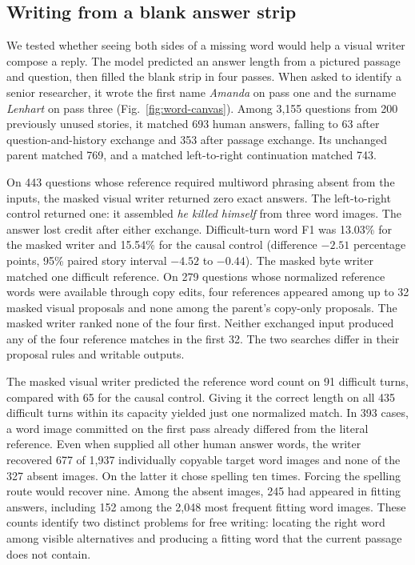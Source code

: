 \documentclass[12pt,a4paper]{article}
\providecommand{\DIFadd}[1]{{\protect\color{blue} \sf #1}} %
\begin{document}
\subsection*{\DIFadd{Writing from a blank answer strip}}
\DIFadd{We tested whether seeing both sides of a missing word would help a visual writer compose a reply. The model predicted an answer length from a pictured passage and question, then filled the blank strip in four passes. When asked to identify a senior researcher, it wrote the first name \emph{Amanda} on pass one and the surname \emph{Lenhart} on pass three (Fig.~\ref{fig:word-canvas}). Among 3,155 questions from 200 previously unused stories, it matched 693 human answers, falling to 63 after question-and-history exchange and 353 after passage exchange. Its unchanged parent matched 769, and a matched left-to-right continuation matched 743.
}

\DIFadd{On 443 questions whose reference required multiword phrasing absent from the inputs, the masked visual writer returned zero exact answers. The left-to-right control returned one: it assembled \emph{he killed himself} from three word images. The answer lost credit after either exchange. Difficult-turn word F1 was 13.03\% for the masked writer and 15.54\% for the causal control (difference $-2.51$ percentage points, 95\% paired story interval $-4.52$ to $-0.44$). The masked byte writer matched one difficult reference. On 279 questions whose normalized reference words were available through copy edits, four references appeared among up to 32 masked visual proposals and none among the parent's copy-only proposals. The masked writer ranked none of the four first. Neither exchanged input produced any of the four reference matches in the first 32. The two searches differ in their proposal rules and writable outputs.
}

\DIFadd{The masked visual writer predicted the reference word count on 91 difficult turns, compared with 65 for the causal control. Giving it the correct length on all 435 difficult turns within its capacity yielded just one normalized match. In 393 cases, a word image committed on the first pass already differed from the literal reference. Even when supplied all other human answer words, the writer recovered 677 of 1,937 individually copyable target word images and none of the 327 absent images. On the latter it chose spelling ten times. Forcing the spelling route would recover nine. Among the absent images, 245 had appeared in fitting answers, including 152 among the 2,048 most frequent fitting word images. These counts identify two distinct problems for free writing: locating the right word among visible alternatives and producing a fitting word that the current passage does not contain.
}
\end{document}
